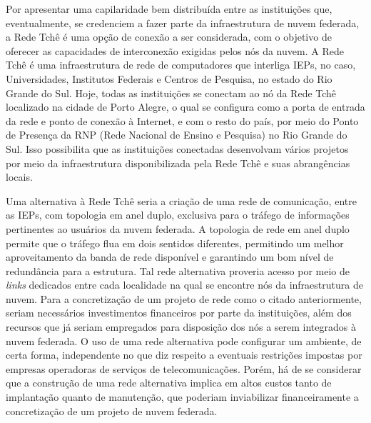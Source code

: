 \documentclass[tese,capa]{texufpel}
\begin{document}
Por apresentar uma capilaridade bem distribuída entre as instituições que, eventualmente, se credenciem a fazer parte da infraestrutura de nuvem federada, a Rede Tchê é uma opção de conexão a ser considerada, com o objetivo de oferecer as capacidades de interconexão exigidas pelos nós da nuvem. A Rede Tchê é uma infraestrutura de rede de computadores que interliga IEPs, no caso, Universidades, Institutos Federais e Centros de Pesquisa, no estado do Rio Grande do Sul. Hoje, todas as instituições se conectam ao nó da Rede Tchê localizado na cidade de Porto Alegre, o qual se configura como a porta de entrada da rede e ponto de conexão à Internet, e com o resto do país, por meio do Ponto de Presença da RNP (Rede Nacional de Ensino e Pesquisa) no Rio Grande do Sul. Isso possibilita que as instituições conectadas desenvolvam vários projetos por meio da infraestrutura disponibilizada pela Rede Tchê e suas abrangências locais.

Uma alternativa à Rede Tchê seria a criação de uma rede de comunicação, entre as IEPs, com topologia em anel duplo, exclusiva para o tráfego de informações pertinentes ao usuários da nuvem federada. A topologia de rede em anel duplo permite que o tráfego flua em dois sentidos diferentes, permitindo um melhor aproveitamento da banda de rede disponível e garantindo um bom nível de redundância para a estrutura. Tal rede alternativa proveria acesso por meio de \emph{links} dedicados entre cada localidade na qual se encontre nós da infraestrutura de nuvem. Para a concretização de um projeto de rede como o citado anteriormente, seriam necessários investimentos financeiros por parte da instituições, além dos recursos que já seriam empregados para disposição dos nós a serem integrados à nuvem federada. O uso de uma rede alternativa pode configurar um ambiente, de certa forma, independente no que diz respeito a eventuais restrições impostas por empresas operadoras de serviços de telecomunicações. Porém, há de se considerar que a construção de uma rede alternativa implica em altos custos tanto de implantação quanto de manutenção, que poderiam inviabilizar financeiramente a concretização de um projeto de nuvem federada.

\end{document}
